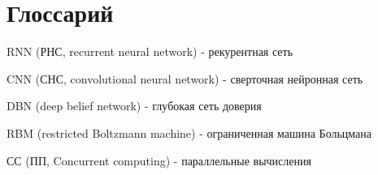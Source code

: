 \chapter*{Глоссарий}

RNN (РНС, recurrent neural network) - рекурентная сеть

CNN (СНС, convolutional neural network) - сверточная нейронная сеть

DBN (deep belief network) - глубокая сеть доверия

RBM (restricted Boltzmann machine) - ограниченная машина Больцмана

СС (ПП, Concurrent computing) - параллельные вычисления
